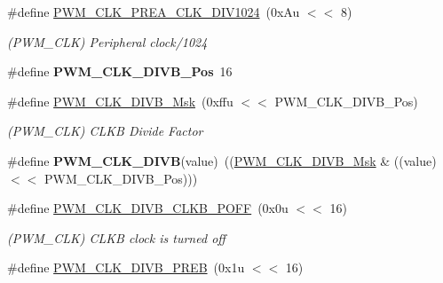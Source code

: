 \begin{DoxyCompactItemize}
\#define \mbox{\hyperlink{group__SAME70__PWM_ga4ac8af0adc0d5842914af03ef91e93ce}{P\+W\+M\+\_\+\+C\+L\+K\+\_\+\+P\+R\+E\+A\+\_\+\+C\+L\+K\+\_\+\+D\+I\+V1024}}~(0x\+Au $<$$<$ 8)
\begin{DoxyCompactList}\small\item\em (P\+W\+M\+\_\+\+C\+LK) Peripheral clock/1024 \end{DoxyCompactList}\item 
\mbox{\label{group__SAME70__PWM_ga4ad68719957eb425c8c4dc8c35a891b1}} 
\#define {\bfseries P\+W\+M\+\_\+\+C\+L\+K\+\_\+\+D\+I\+V\+B\+\_\+\+Pos}~16
\item 
\mbox{\label{group__SAME70__PWM_ga0f10b800816f89c333627527117fdf61}} 
\#define \mbox{\hyperlink{group__SAME70__PWM_ga0f10b800816f89c333627527117fdf61}{P\+W\+M\+\_\+\+C\+L\+K\+\_\+\+D\+I\+V\+B\+\_\+\+Msk}}~(0xffu $<$$<$ P\+W\+M\+\_\+\+C\+L\+K\+\_\+\+D\+I\+V\+B\+\_\+\+Pos)
\begin{DoxyCompactList}\small\item\em (P\+W\+M\+\_\+\+C\+LK) C\+L\+KB Divide Factor \end{DoxyCompactList}\item 
\mbox{\label{group__SAME70__PWM_ga78313c3c81971a4d15098efafe65705d}} 
\#define {\bfseries P\+W\+M\+\_\+\+C\+L\+K\+\_\+\+D\+I\+VB}(value)~((\mbox{\hyperlink{group__SAMV71__PWM_ga0f10b800816f89c333627527117fdf61}{P\+W\+M\+\_\+\+C\+L\+K\+\_\+\+D\+I\+V\+B\+\_\+\+Msk}} \& ((value) $<$$<$ P\+W\+M\+\_\+\+C\+L\+K\+\_\+\+D\+I\+V\+B\+\_\+\+Pos)))
\item 
\mbox{\label{group__SAME70__PWM_gae74dee51491421d03783282b256287e8}} 
\#define \mbox{\hyperlink{group__SAME70__PWM_gae74dee51491421d03783282b256287e8}{P\+W\+M\+\_\+\+C\+L\+K\+\_\+\+D\+I\+V\+B\+\_\+\+C\+L\+K\+B\+\_\+\+P\+O\+FF}}~(0x0u $<$$<$ 16)
\begin{DoxyCompactList}\small\item\em (P\+W\+M\+\_\+\+C\+LK) C\+L\+KB clock is turned off \end{DoxyCompactList}\item 
\mbox{\label{group__SAME70__PWM_gaab33aacf0706fdcd8ca7363dc41ad65a}} 
\#define \mbox{\hyperlink{group__SAME70__PWM_gaab33aacf0706fdcd8ca7363dc41ad65a}{P\+W\+M\+\_\+\+C\+L\+K\+\_\+\+D\+I\+V\+B\+\_\+\+P\+R\+EB}}~(0x1u $<$$<$ 16)
$$
\end{DoxyCompactItemize}
